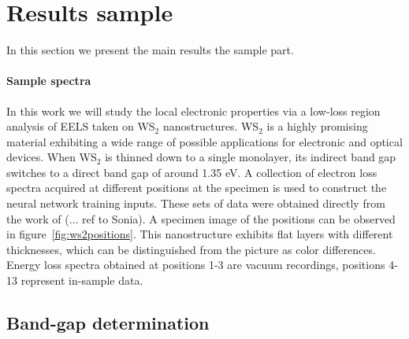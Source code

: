 \section{Results sample}
\label{sec:results_sample}

In this section we present the main results the sample part.


\paragraph{Sample spectra}
%
In this work we will study the local electronic properties
via a low-loss region analysis of EELS taken on
WS$_2$ nanostructures.
%
WS$_2$ is a highly promising material exhibiting a wide range of 
possible applications for electronic and optical devices.
%
When WS$_2$ is thinned down to a single monolayer, its 
indirect band gap switches to a direct band gap of around 1.35 eV.
%
A collection of electron loss spectra acquired at different positions 
at the specimen is used to construct the neural network training inputs. 
%
These sets of data were obtained directly from the work of (... ref to Sonia).
%
A specimen image of the positions can be observed in figure~\ref{fig:ws2positions}.  
This nanostructure exhibits flat layers with different thicknesses, which 
can be distinguished from the picture as color differences.
%
Energy loss spectra obtained at positions 1-3 are vacuum recordings, 
positions 4-13 represent in-sample data.




\subsection{Band-gap determination}


